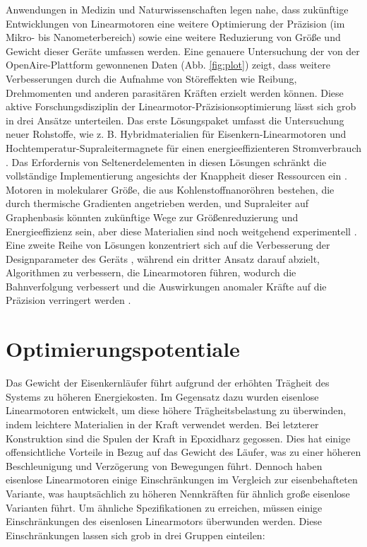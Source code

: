 \documentclass[
  oneside]{book}
\begin{document}
Anwendungen in Medizin und Naturwissenschaften legen nahe, dass zukünftige Entwicklungen von Linearmotoren eine weitere Optimierung der Präzision (im Mikro- bis Nanometerbereich) sowie eine weitere Reduzierung von Größe und Gewicht dieser Geräte umfassen werden. Eine genauere Untersuchung der von der OpenAire-Plattform gewonnenen Daten (Abb. \ref{fig:plot}) zeigt, dass weitere Verbesserungen durch die Aufnahme von Störeffekten wie Reibung, Drehmomenten und anderen parasitären Kräften erzielt werden können. Diese aktive Forschungsdisziplin der Linearmotor-Präzisionsoptimierung lässt sich grob in drei Ansätze unterteilen. Das erste Lösungspaket umfasst die Untersuchung neuer Rohstoffe, wie z. B. Hybridmaterialien für Eisenkern-Linearmotoren \citep{Liu2021} und Hochtemperatur-Supraleitermagnete für einen energieeffizienteren Stromverbrauch \citep{zhang2016, palka2021}. Das Erfordernis von Seltenerdelementen in diesen Lösungen schränkt die vollständige Implementierung angesichts der Knappheit dieser Ressourcen ein \citep{deboer2013}. Motoren in molekularer Größe, die aus Kohlenstoffnanoröhren bestehen, die durch thermische Gradienten angetrieben werden, und Supraleiter auf Graphenbasis könnten zukünftige Wege zur Größenreduzierung und Energieeffizienz sein, aber diese Materialien sind noch weitgehend experimentell \citep{zambrano2009, cao2018}. Eine zweite Reihe von Lösungen konzentriert sich auf die Verbesserung der Designparameter des Geräts \citep{kuang2017, kramer2021}, während ein dritter Ansatz darauf abzielt, Algorithmen zu verbessern, die Linearmotoren führen, wodurch die Bahnverfolgung verbessert und die Auswirkungen anomaler Kräfte auf die Präzision verringert werden \citep{nguyen2016, mo2017, yunbo2018, chen2020, yao2021}.

\hypertarget{optim}{%
\section{Optimierungspotentiale}\label{optim}}

Das Gewicht der Eisenkernläufer führt aufgrund der erhöhten Trägheit des Systems zu höheren Energiekosten. Im Gegensatz dazu wurden eisenlose Linearmotoren entwickelt, um diese höhere Trägheitsbelastung zu überwinden, indem leichtere Materialien in der Kraft verwendet werden. Bei letzterer Konstruktion sind die Spulen der Kraft in Epoxidharz gegossen. Dies hat einige offensichtliche Vorteile in Bezug auf das Gewicht des Läufer, was zu einer höheren Beschleunigung und Verzögerung von Bewegungen führt. Dennoch haben eisenlose Linearmotoren einige Einschränkungen im Vergleich zur eisenbehafteten Variante, was hauptsächlich zu höheren Nennkräften für ähnlich große eisenlose Varianten führt. Um ähnliche Spezifikationen zu erreichen, müssen einige Einschränkungen des eisenlosen Linearmotors überwunden werden. Diese Einschränkungen lassen sich grob in drei Gruppen einteilen:
\end{document}
